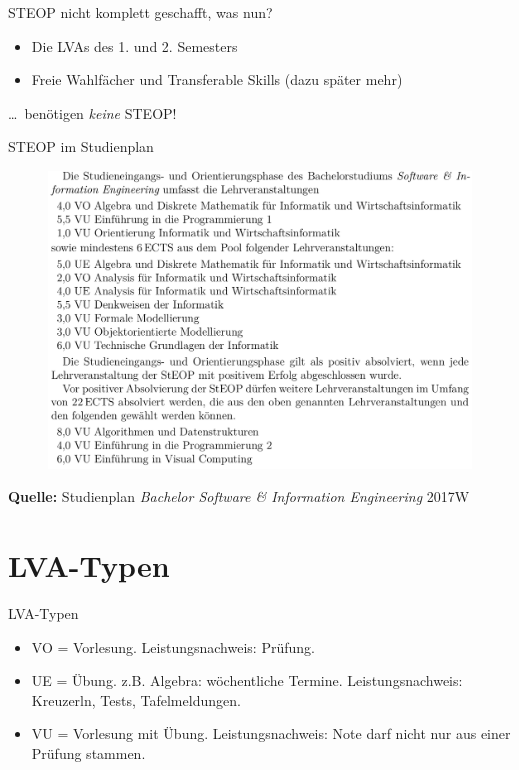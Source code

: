 \documentclass{beamer}
\begin{document}
\begin{frame}{STEOP nicht komplett geschafft, was nun?}
    \begin{itemize}
        \item Die LVAs des 1. und 2. Semesters
        \item Freie Wahlfächer und Transferable Skills (dazu später mehr)
    \end{itemize}
    \ldots\ benötigen \textit{keine} STEOP!\\
\end{frame}

\begin{frame}{STEOP im Studienplan}
    \begin{figure}[htp]
        \centering
        \includegraphics[width=1\textwidth]{steop.png}
    \end{figure}
    \tiny \textbf{Quelle:} Studienplan \textit{Bachelor Software \&
        Information Engineering} 2017W
\end{frame}

\section{LVA-Typen}
\begin{frame}{LVA-Typen}
    \begin{itemize}
    \item VO = Vorlesung.
          Leistungsnachweis: Prüfung.
    \item UE = Übung.
          z.B. Algebra: wöchentliche Termine.
          Leistungsnachweis: Kreuzerln, Tests, Tafelmeldungen.
    \item VU = Vorlesung mit Übung.
          Leistungsnachweis: Note darf nicht nur aus einer Prüfung stammen.
    \end{itemize}
\end{frame}
\end{document}
